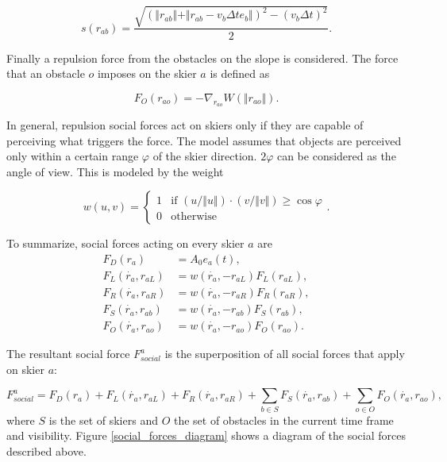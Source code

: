 \documentclass[12pt,a4paper,twoside]{book}
\begin{document}
\begin{equation}\label{skier_s}
s(r_{ab})=\frac{\sqrt{(\Vert r_{ab} \Vert + \Vert r_{ab}-v_b \Delta t e_b \Vert )^2-(v_b \Delta t)^2}}{2}.
\end{equation}

Finally a repulsion force from the obstacles on the slope is considered. The force that an obstacle $o$ imposes on the skier $a$ is defined as

\begin{equation}\label{obstacle_force}
F_O(r_{ao})=-\nabla_{r_{ao}}W(\Vert r_{ao} \Vert ).
\end{equation}

In general, repulsion social forces act on skiers only if they are capable of perceiving what triggers the force. The model assumes that objects are perceived only within a certain range $\varphi$ of the skier direction. $2\varphi$ can be considered as the angle of view. This is modeled by the weight

\begin{equation}\label{visibility}
w(u,v)=\begin{cases}
  1 & \text{if $(u/\Vert u \Vert)\cdot (v/\Vert v \Vert) \geq \cos \varphi$} \\
  0 & \text{otherwise }
  \end{cases}.
\end{equation}

To summarize, social forces acting on every skier $a$ are
\begin{align}\label{social_forces_tb}
F_D(r_a)&=A_0 e_a(t),\\
F_L(\dot{r_a},r_{aL})&=w(\dot{r_a},-r_{aL})F_L(r_{aL}),\\
F_R(\dot{r_a},r_{aR})&=w(\dot{r_a},-r_{aR})F_R(r_{aR}),\\
F_S(\dot{r_a},r_{ab})&=w(\dot{r_a},-r_{ab})F_S(r_{ab}),\\
F_O(\dot{r_a},r_{ao})&=w(\dot{r_a},-r_{ao})F_O(r_{ao}).
\end{align}

The resultant social force $F^a_{social}$ is the superposition of all social forces that apply on skier $a$:

\begin{equation}
F^a_{social}=F_D(r_a)+F_L(\dot{r_a},r_{aL})+F_R(\dot{r_a},r_{aR})+\sum_{b\in S} F_S(\dot{r_a},r_{ab})+\sum_{o \in O} F_O(\dot{r_a},r_{ao}),\nonumber
\end{equation}
where $S$ is the set of skiers and $O$ the set of obstacles in the current time frame and visibility. Figure \ref{social_forces_diagram} shows a diagram of the social forces described above.
\end{document}
